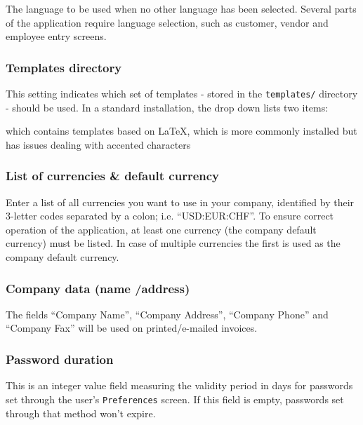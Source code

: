 The language to be used when no other language has been selected. Several parts of the
application require language selection, such as customer, vendor and employee entry screens.

\subsubsection{Templates directory}
\label{subsubsec-company-config-defaults-templates}

This setting indicates which set of templates - stored in the
   \texttt{templates/} directory - should be used. In a standard installation, the drop down
   lists two items:
\begin{description}[style=nextline]
   \item [demo] which contains templates based on \LaTeX, which is more commonly installed but has issues dealing with accented characters
   \end{description}


\subsubsection{List of currencies \& default currency}
\label{subsubsec-company-config-defaults-currencies}

Enter a list of all currencies you want
to use in your company, identified by their 3-letter codes separated by a colon; i.e.
``USD:EUR:CHF''. To ensure correct operation of the application, at least one currency
(the company default currency) must be listed. In case of multiple currencies the first
is used as the company default currency.

\subsubsection{Company data (name /address)}
\label{subsubsec-company-config-defaults-name-address}

The fields ``Company Name'', ``Company Address'',
``Company Phone'' and ``Company Fax'' will be used on printed/e-mailed invoices.

\subsubsection{Password duration}
\label{subsubsec-company-config-defaults-password-duration}

This is an integer value field measuring the validity period in days for passwords set through
the user's \texttt{Preferences} screen. If this field is empty, passwords set through that method
won't expire.

